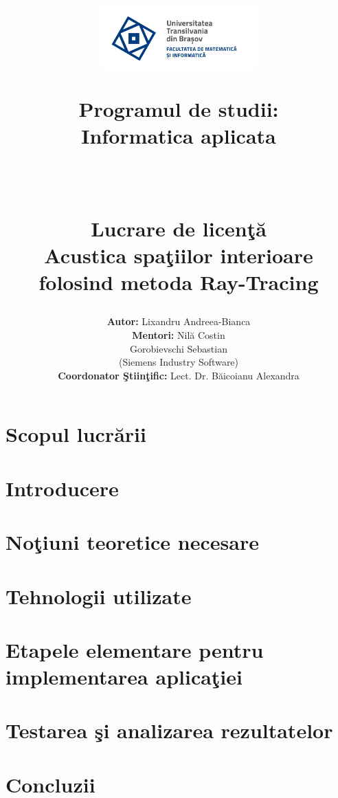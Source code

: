 \documentclass[12pt, a4paper]{report} %
\title{\begin{minipage} {0.3\textwidth}
		{{\includegraphics[width=6cm]{imagini/sigla.png} }}%
	\end{minipage}
	\hfill
	\begin{minipage}{0.3\textwidth}
		\fontsize{10pt}{6pt}\selectfont
			Programul de studii:\\
			Informatica aplicata\\
	\end{minipage}
	\vspace*{7\baselineskip}\\
	\begin{center}
			\fontsize{22pt}{6pt}\selectfont
		\bf Lucrare de licen\c{t}\u{a}\\
		\vspace{5mm}
		Acustica spa\c{t}iilor interioare folosind metoda Ray-Tracing
		\vspace*{30\baselineskip}
	\end{center}
	}
\author{\fontsize{15pt}{6pt}\selectfont
	{\bf Autor:} \hspace{5.1cm}Lixandru Andreea-Bianca\\
	\vspace{3mm}
	{\bf Mentori:} \hspace{4.6cm}Nil\u{a} Costin\\
	\vspace{3mm}
	\hspace{7cm}Gorobievschi Sebastian\\
	\vspace{3mm}
	\hspace{7cm}(Siemens Industry Software)\\
	\vspace{3mm}
	{\bf Coordonator \c{S}tiin\c{t}ific:} \hspace{1cm}Lect. Dr. B\u{a}icoianu Alexandra}
\date{\begin{center} Bra\c{s}ov, 2021 \end{center}}
\makeatletter
\renewcommand{\maketitle}{\bgroup\setlength{\parindent}{0pt}
	\begin{flushleft}
		\textbf{\@title}
		
		\@author
		
		\vspace{10mm}
		\@date
	\end{flushleft}\egroup
}
\makeatother
\begin{document}
	
	\maketitle	
	\thispagestyle{empty} %
	
	\newpage
	\tableofcontents
	\thispagestyle{empty}

		
	
	\chapter*{Scopul lucr\u arii}
		
		
	\chapter*{Introducere}
		
	\chapter{No\c{t}iuni teoretice necesare}
		
	\chapter{Tehnologii utilizate}
		
	\chapter{Etapele elementare pentru implementarea aplica\c{t}iei}
			
	\chapter{Testarea \c{s}i analizarea rezultatelor}
		
	\chapter{Concluzii}
		
	
	
	\newpage
	
\end{document}
